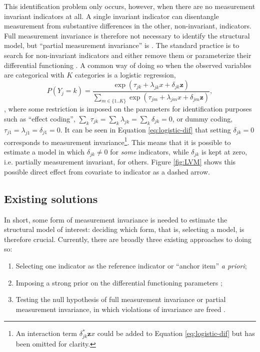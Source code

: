 \documentclass[letterpaper,12pt]{article}
\begin{document}
This identification problem only occurs, however, when there are no measurement invariant indicators at all. A single invariant indicator can disentangle measurement from substantive differences in the other, non-invariant, indicators. Full measurement invariance is therefore not necessary to identify the structural model, but ``partial measurement invariance'' is \citep{byrne1989testing}. The standard practice is to search for non-invariant indicators and either remove them or parameterize their differential functioning \citep{Holland:1993aa}. 
A common way of doing so when the observed variables are categorical with $K$ categories is a logistic regression, 
\begin{equation}
	P(Y_j = k) = \frac{\exp(\tau_{jk} + \lambda_{jk} x + \delta_{jk} \mathbf{z})}{\sum_{m \in \{1..K\}} \exp(\tau_{jm} + \lambda_{jm} x + \delta_{jm} \mathbf{z})},
	\label{eq:logistic-dif}
\end{equation}
\citep{mellenbergh1989item,kankaras2010testing}, where some restriction is imposed on the parameters for identification purposes such as ``effect coding'', $\sum_k \tau_{jk} = \sum_k \lambda_{jk} =\sum_k \delta_{jk} = 0$, or dummy coding, $\tau_{j1} = \lambda_{j1} = \delta_{j1} = 0$. 
It can be seen in Equation \ref{eq:logistic-dif} that setting $\delta_{jk} = 0$ corresponds to measurement invariance\footnote{An interaction term $\delta_{jk}^* \mathbf{z}x$ could be added to Equation \ref{eq:logistic-dif} but has been omitted for clarity.}. This means that it is possible to estimate a model in which $\delta_{jk} \neq 0$ for \emph{some} indicators, while $\delta_{jk}$ is kept at zero, i.e. partially measurement invariant, for others. 
Figure \ref{fig:LVM} shows this possible direct effect from covariate to indicator as a dashed arrow. 

\subsection{Existing solutions}

In short, some form of measurement invariance is needed to estimate the structural model of interest: deciding which form, that is, selecting a model, is therefore crucial. Currently, there are broadly three existing approaches to doing so:
\begin{enumerate}
	\item Selecting one indicator as the reference indicator or ``anchor item'' \emph{a priori};
	\item Imposing a strong prior on the differential functioning parameters \citep{muthen2012bayesian};
	\item Testing the null hypothesis of full measurement invariance \citep{steenkamp_assessing_1998,french2006confirmatory} or partial measurement invariance, in which violations of invariance are freed  \citep{byrne1989testing,saris2009testing}.
\end{enumerate}
\end{document}

